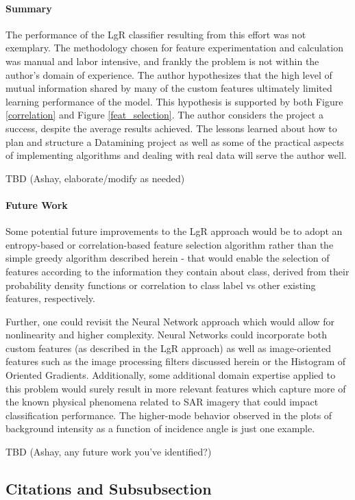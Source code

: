 \documentclass[fleqn,10pt]{SelfArx} %
\begin{document}
\paragraph{Summary}
The performance of the LgR classifier resulting from this effort was not exemplary.  The methodology chosen for feature experimentation and calculation was manual and labor intensive, and frankly the problem is not within the author's domain of experience.  The author hypothesizes that the high level of mutual information shared by many of the custom features ultimately limited learning performance of the model.  This hypothesis is supported by both Figure \ref{correlation} and Figure \ref{feat_selection}.  The author considers the project a success, despite the average results achieved.  The lessons learned about how to plan and structure a Datamining project as well as some of the practical aspects of implementing algorithms and dealing with real data will serve the author well.

TBD (Ashay, elaborate/modify as needed)

\paragraph{Future Work}
Some potential future improvements to the LgR approach would be to adopt an entropy-based or correlation-based feature selection algorithm rather than the simple greedy algorithm described herein - that would enable the selection of features according to the information they contain about class, derived from their probability density functions or correlation to class label vs other existing features, respectively.  

Further, one could revisit the Neural Network approach which would allow for nonlinearity and higher complexity.  Neural Networks could incorporate both custom features (as described in the LgR approach) as well as image-oriented features such as the image processing filters discussed herein or the Histogram of Oriented Gradients.  Additionally, some additional domain expertise applied to this problem would surely result in more relevant features which capture more of the known physical phenomena related to SAR imagery that could impact classification performance.  The higher-mode behavior observed in the plots of background intensity as a function of incidence angle is just one example.

TBD (Ashay, any future work you've identified?)

\subsection{Citations and Subsubsection}
\end{document}
